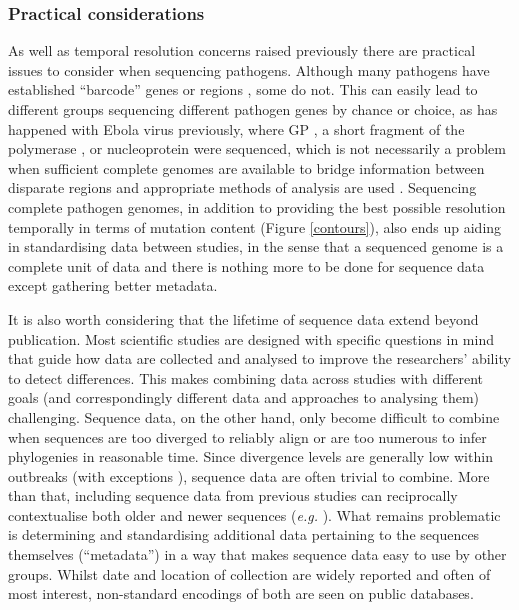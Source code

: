 \documentclass[11pt,oneside,letterpaper]{article}
\begin{document}
\subsubsection*{Practical considerations}
As well as temporal resolution concerns raised previously there are practical issues to consider when sequencing pathogens.
Although many pathogens have established ``barcode'' genes or regions \citep{towner_rapid_2004}, some do not.
This can easily lead to different groups sequencing different pathogen genes by chance or choice, as has happened with Ebola virus previously, where GP \citep{georges-courbot_isolation_1997}, a short fragment of the polymerase \citep{leroy_fruit_2005}, or nucleoprotein \citep{rouquet_wild_2005} were sequenced, which is not necessarily a problem when sufficient complete genomes are available to bridge information between disparate regions and appropriate methods of analysis are used \citep{dudas_phylogenetic_2014}.
Sequencing complete pathogen genomes, in addition to providing the best possible resolution temporally in terms of mutation content (Figure \ref{contours}), also ends up aiding in standardising data between studies, in the sense that a sequenced genome is a complete unit of data and there is nothing more to be done for sequence data except gathering better metadata.

It is also worth considering that the lifetime of sequence data extend beyond publication.
Most scientific studies are designed with specific questions in mind that guide how data are collected and analysed to improve the researchers' ability to detect differences.
This makes combining data across studies with different goals (and correspondingly different data and approaches to analysing them) challenging.
Sequence data, on the other hand, only become difficult to combine when sequences are too diverged to reliably align or are too numerous to infer phylogenies in reasonable time.
Since divergence levels are generally low within outbreaks (with exceptions \citep{andersen_clinical_2015}), sequence data are often trivial to combine.
More than that, including sequence data from previous studies can reciprocally contextualise both older and newer sequences (\textit{e.g.} \cite{mena_origins_2016}).
What remains problematic is determining and standardising additional data pertaining to the sequences themselves (``metadata'') in a way that makes sequence data easy to use by other groups.
Whilst date and location of collection are widely reported and often of most interest, non-standard encodings of both are seen on public databases.
\end{document}
